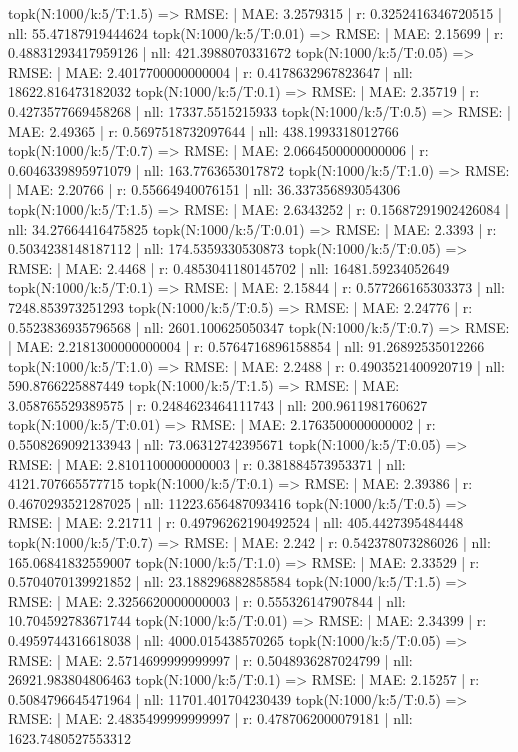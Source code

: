 topk(N:1000/k:5/T:1.5) => RMSE: | MAE: 3.2579315 | r: 0.3252416346720515 | nll: 55.47187919444624
topk(N:1000/k:5/T:0.01) => RMSE: | MAE: 2.15699 | r: 0.48831293417959126 | nll: 421.3988070331672
topk(N:1000/k:5/T:0.05) => RMSE: | MAE: 2.4017700000000004 | r: 0.4178632967823647 | nll: 18622.816473182032
topk(N:1000/k:5/T:0.1) => RMSE: | MAE: 2.35719 | r: 0.4273577669458268 | nll: 17337.5515215933
topk(N:1000/k:5/T:0.5) => RMSE: | MAE: 2.49365 | r: 0.5697518732097644 | nll: 438.1993318012766
topk(N:1000/k:5/T:0.7) => RMSE: | MAE: 2.0664500000000006 | r: 0.6046339895971079 | nll: 163.7763653017872
topk(N:1000/k:5/T:1.0) => RMSE: | MAE: 2.20766 | r: 0.55664940076151 | nll: 36.337356893054306
topk(N:1000/k:5/T:1.5) => RMSE: | MAE: 2.6343252 | r: 0.15687291902426084 | nll: 34.27664416475825
topk(N:1000/k:5/T:0.01) => RMSE: | MAE: 2.3393 | r: 0.5034238148187112 | nll: 174.5359330530873
topk(N:1000/k:5/T:0.05) => RMSE: | MAE: 2.4468 | r: 0.4853041180145702 | nll: 16481.59234052649
topk(N:1000/k:5/T:0.1) => RMSE: | MAE: 2.15844 | r: 0.577266165303373 | nll: 7248.853973251293
topk(N:1000/k:5/T:0.5) => RMSE: | MAE: 2.24776 | r: 0.5523836935796568 | nll: 2601.100625050347
topk(N:1000/k:5/T:0.7) => RMSE: | MAE: 2.2181300000000004 | r: 0.5764716896158854 | nll: 91.26892535012266
topk(N:1000/k:5/T:1.0) => RMSE: | MAE: 2.2488 | r: 0.4903521400920719 | nll: 590.8766225887449
topk(N:1000/k:5/T:1.5) => RMSE: | MAE: 3.058765529389575 | r: 0.2484623464111743 | nll: 200.9611981760627
topk(N:1000/k:5/T:0.01) => RMSE: | MAE: 2.1763500000000002 | r: 0.5508269092133943 | nll: 73.06312742395671
topk(N:1000/k:5/T:0.05) => RMSE: | MAE: 2.8101100000000003 | r: 0.381884573953371 | nll: 4121.707665577715
topk(N:1000/k:5/T:0.1) => RMSE: | MAE: 2.39386 | r: 0.4670293521287025 | nll: 11223.656487093416
topk(N:1000/k:5/T:0.5) => RMSE: | MAE: 2.21711 | r: 0.49796262190492524 | nll: 405.4427395484448
topk(N:1000/k:5/T:0.7) => RMSE: | MAE: 2.242 | r: 0.542378073286026 | nll: 165.06841832559007
topk(N:1000/k:5/T:1.0) => RMSE: | MAE: 2.33529 | r: 0.5704070139921852 | nll: 23.188296882858584
topk(N:1000/k:5/T:1.5) => RMSE: | MAE: 2.3256620000000003 | r: 0.555326147907844 | nll: 10.704592783671744
topk(N:1000/k:5/T:0.01) => RMSE: | MAE: 2.34399 | r: 0.4959744316618038 | nll: 4000.015438570265
topk(N:1000/k:5/T:0.05) => RMSE: | MAE: 2.5714699999999997 | r: 0.5048936287024799 | nll: 26921.983804806463
topk(N:1000/k:5/T:0.1) => RMSE: | MAE: 2.15257 | r: 0.5084796645471964 | nll: 11701.401704230439
topk(N:1000/k:5/T:0.5) => RMSE: | MAE: 2.4835499999999997 | r: 0.4787062000079181 | nll: 1623.7480527553312
